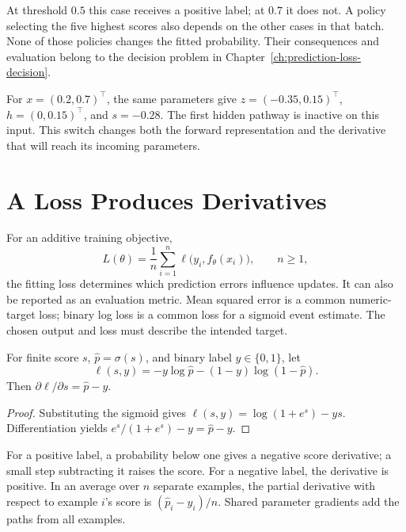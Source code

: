 At threshold $0.5$ this case receives a positive label; at $0.7$ it does not. A policy selecting the five highest scores also depends on the other cases in that batch. None of those policies changes the fitted probability. Their consequences and evaluation belong to the decision problem in Chapter~\ref{ch:prediction-loss-decision}.

For $x=(0.2,0.7)^\top$, the same parameters give $z=(-0.35,0.15)^\top$, $h=(0,0.15)^\top$, and $s=-0.28$. The first hidden pathway is inactive on this input. This switch changes both the forward representation and the derivative that will reach its incoming parameters.

\section{A Loss Produces Derivatives}

For an additive training objective,
\[
L(\theta)=\frac1n\sum_{i=1}^{n}\ell\bigl(y_i,f_\theta(x_i)\bigr),
\qquad n\geq1,
\]
the fitting loss determines which prediction errors influence updates. It can also be reported as an evaluation metric. Mean squared error is a common numeric-target loss; binary log loss is a common loss for a sigmoid event estimate. The chosen output and loss must describe the intended target.

\par\medskip\noindent\begin{minipage}{\linewidth}
\begin{theorem}
For finite score $s$, $\hat p=\sigma(s)$, and binary label $y\in\{0,1\}$, let
\[
\ell(s,y)=-y\log\hat p-(1-y)\log(1-\hat p).
\]
Then $\partial\ell/\partial s=\hat p-y$.
\end{theorem}
\begin{proof}
Substituting the sigmoid gives $\ell(s,y)=\log(1+e^s)-ys$. Differentiation yields $e^s/(1+e^s)-y=\hat p-y$.
\end{proof}
\end{minipage}\par\medskip

For a positive label, a probability below one gives a negative score derivative; a small step subtracting it raises the score. For a negative label, the derivative is positive. In an average over $n$ separate examples, the partial derivative with respect to example $i$'s score is $(\hat p_i-y_i)/n$. Shared parameter gradients add the paths from all examples.

